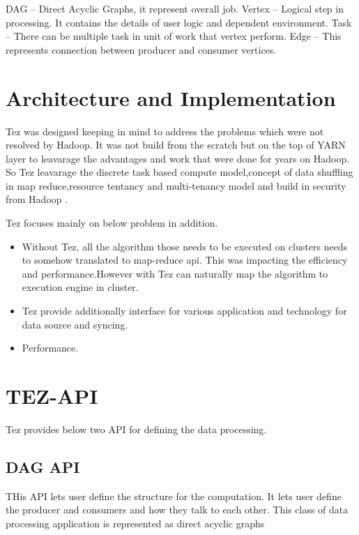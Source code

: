 \documentclass[9pt,twocolumn,twoside]{../../styles/osajnl}
\begin{document}
 DAG -- Direct Acyclic Graphs, it represent overall job.  
 Vertex -- Logical step in processing. It contains the details of user logic and dependent environment.
 Task --   There can be multiple task in unit of work that vertex perform. 
 Edge --  This represents connection between producer and consumer vertices.


\section{Architecture and Implementation}

Tez was designed keeping in mind to address the problems which were not resolved by Hadoop. 
It was not build from the scratch but on the top of YARN layer to leavarage the 
advantages and work that were done for years on Hadoop. So Tez leavarage the discrete task based compute model,concept of data shuffling in map reduce,resource tentancy and
multi-tenancy model and build in security from Hadoop . 

Tez focuses mainly on below problem in addition.

\begin{itemize}
\item Without Tez, all the algorithm those needs to be executed on clusters needs to somehow translated to map-reduce api. This was impacting the efficiency and performance.However with Tez can naturally map the algorithm to execution engine in cluster.
        
\item Tez provide additionally interface for various application and technology for data source and syncing.

\item Performance.
\end{itemize}	


\section{TEZ-API}

Tez provides below two API for defining the data processing. 

\subsection{ DAG API}
	THis API lets user define the structure for the computation.
	It lets user define the producer and consumers and how they talk to each other.
	This class of data processing application is represented as direct acyclic graphs 	
\end{document}
